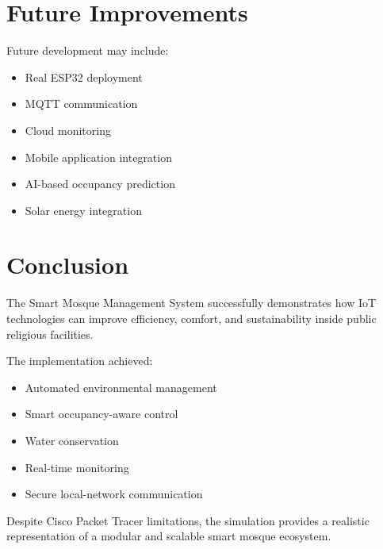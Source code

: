 \documentclass[12pt, a4paper]{article}
\begin{document}
\section{Future Improvements}

Future development may include:
\begin{itemize}
    \item Real ESP32 deployment
    \item MQTT communication
    \item Cloud monitoring
    \item Mobile application integration
    \item AI-based occupancy prediction
    \item Solar energy integration
\end{itemize}

\section{Conclusion}

The Smart Mosque Management System successfully demonstrates how IoT technologies can improve efficiency, comfort, and sustainability inside public religious facilities.

The implementation achieved:
\begin{itemize}
    \item Automated environmental management
    \item Smart occupancy-aware control
    \item Water conservation
    \item Real-time monitoring
    \item Secure local-network communication
\end{itemize}

Despite Cisco Packet Tracer limitations, the simulation provides a realistic representation of a modular and scalable smart mosque ecosystem.

\cleardoublepage
{}
\listoffigures
\end{document}
